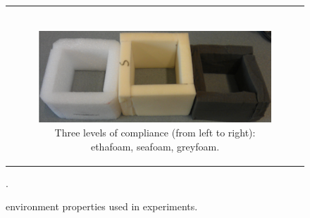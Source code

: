 \begin{figure}[]
\begin{tabular}{c}
\begin{subfigure}[]{1\linewidth}
        \end{subfigure} \\
        \begin{subfigure}[]{1\linewidth}
            \includegraphics[width=\linewidth]{images/setup_c}
            \caption{Three levels of compliance (from left to right): ethafoam, seafoam, greyfoam.}
        \end{subfigure}
    \end{tabular}
    \caption{environment properties used in experiments.}.
    \label{fig:vis_properties}
\end{figure}


